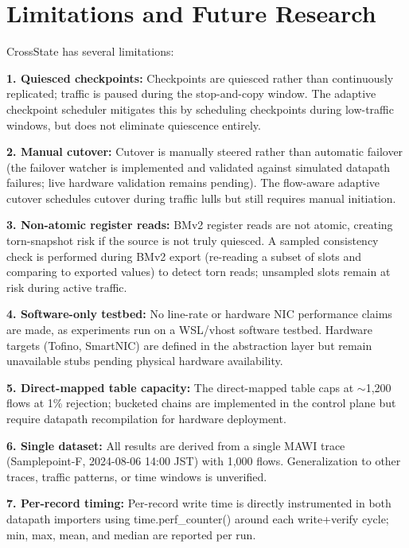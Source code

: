 \documentclass[10pt, conference, compsoc]{IEEEtran}
\begin{document}
\section{Limitations and Future Research}
\label{sec:limitations}
CrossState has several limitations:

\textbf{1. Quiesced checkpoints:} Checkpoints are quiesced rather than
continuously replicated; traffic is paused during the stop-and-copy window.
The adaptive checkpoint scheduler mitigates this by scheduling checkpoints
during low-traffic windows, but does not eliminate quiescence entirely.

\textbf{2. Manual cutover:} Cutover is manually steered rather than automatic
failover (the failover watcher is implemented and validated against simulated
datapath failures; live hardware validation remains pending). The flow-aware
adaptive cutover schedules cutover during traffic lulls but still requires
manual initiation.

\textbf{3. Non-atomic register reads:} BMv2 register reads are not atomic,
creating torn-snapshot risk if the source is not truly quiesced. A sampled
consistency check is performed during BMv2 export (re-reading a subset of
slots and comparing to exported values) to detect torn reads; unsampled slots
remain at risk during active traffic.

\textbf{4. Software-only testbed:} No line-rate or hardware NIC performance
claims are made, as experiments run on a WSL/vhost software testbed. Hardware
targets (Tofino, SmartNIC) are defined in the abstraction layer but remain
unavailable stubs pending physical hardware availability.

\textbf{5. Direct-mapped table capacity:} The direct-mapped table caps at
$\sim$1{,}200 flows at 1\% rejection; bucketed chains are implemented in the
control plane but require datapath recompilation for hardware deployment.

\textbf{6. Single dataset:} All results are derived from a single MAWI trace
(Samplepoint-F, 2024-08-06 14:00 JST) with 1,000 flows. Generalization to
other traces, traffic patterns, or time windows is unverified.

\textbf{7. Per-record timing:} Per-record write time is directly instrumented
in both datapath importers using time.perf\_counter() around each write+verify
cycle; min, max, mean, and median are reported per run.
\end{document}
